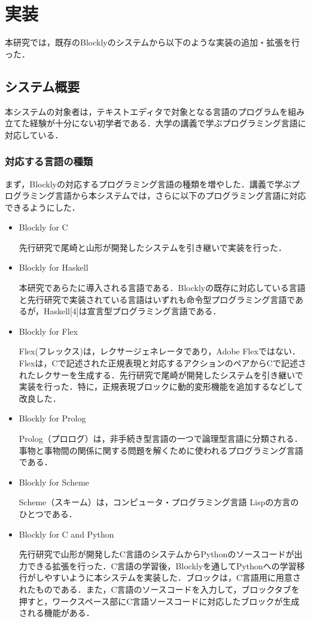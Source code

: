 \documentclass{risepaper}
\begin{document}
   \chapter{実装}
   
本研究では，既存のBlocklyのシステムから以下のような実装の追加・拡張を行った．
    
   \section{システム概要}

本システムの対象者は，テキストエディタで対象となる言語のプログラムを組み立てた経験が十分にない初学者である．大学の講義で学ぶプログラミング言語に対応している．
   
   \subsection{対応する言語の種類}
   
まず，Blocklyの対応するプログラミング言語の種類を増やした．講義で学ぶプログラミング言語から本システムでは，さらに以下のプログラミング言語に対応できるようにした．

\begin{itemize}
\item Blockly for C

先行研究で尾崎と山形が開発したシステムを引き継いで実装を行った．

\item Blockly for Haskell

本研究であらたに導入される言語である．Blocklyの既存に対応している言語と先行研究で実装されている言語はいずれも命令型プログラミング言語であるが，Haskell[4]は宣言型プログラミング言語である．

\item Blockly for Flex

Flex\cite{flex}(フレックス)は，レクサージェネレータであり，Adobe Flex\texttrademark ではない．Flexは，Cで記述された正規表現と対応するアクションのペアからCで記述されたレクサーを生成する．先行研究で尾崎が開発したシステムを引き継いで実装を行った．特に，正規表現ブロックに動的変形機能を追加するなどして改良した．

\item Blockly for Prolog

Prolog（プロログ）は，非手続き型言語の一つで論理型言語に分類される．事物と事物間の関係に関する問題を解くために使われるプログラミング言語である．

\item Blockly for Scheme

Scheme（スキーム）は，コンピュータ・プログラミング言語 Lispの方言のひとつである．

\item Blockly for C and Python

先行研究で山形が開発したC言語のシステムからPythonのソースコードが出力できる拡張を行った．C言語の学習後，Blocklyを通してPythonへの学習移行がしやすいように本システムを実装した．ブロックは，C言語用に用意されたものである．また，C言語のソースコードを入力して，ブロックタブを押すと，ワークスペース部にC言語ソースコードに対応したブロックが生成される機能がある．

\end{itemize} 
   
\end{document}
